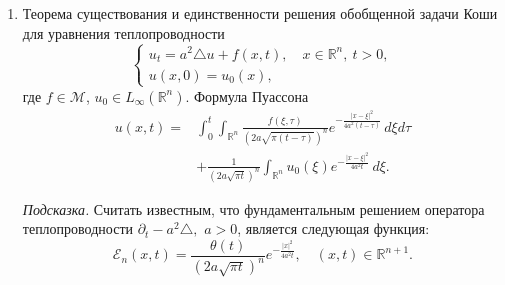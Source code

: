 \documentclass[12pt,a4paper,draft]{article}
\DeclareRobustCommand*{\т}{~--- }
\DeclareRobustCommand*{\ч}{~-- }
\begin{document}
\begin{enumerate}
\item
Теорема существования и единственности решения обобщенной задачи
Коши для уравнения теплопроводности
$$
    \left\{
        \begin{array}{l}
            u_t = a^2 \triangle u + f (x, t),
            \quad
            x \in {\mathbb R}^n,
            \:
            t > 0,
            \\
            u (x, 0) = u_0 (x),
        \end{array}
    \right.
$$
где $f \in {\mathcal M}$, $u_0 \in L_\infty ({\mathbb R}^n)$.
Формула Пуассона
\begin{align*}
    u (x, t)
    =
    {}
    &
    \int_0^t
    \int_{
        {\mathbb R}^n
    }
    \frac{
        f (\xi, \tau)
    }{
        (
            2
            a
            \sqrt {
                \pi
                (t - \tau)
            }
        )^n
    }
    e^{
        - \frac{
            |x - \xi|^2
        }{
            4
            a^2
            (t - \tau)
        }
    }
    \,
    d\xi
    d\tau
    \\
    &
    +
    \frac{
        1
    }{
        (
            2
            a
            \sqrt {
                \pi
                t
            }
        )^n
    }
    \int_{
        {\mathbb R}^n
    }
    u_0 (\xi)
    e^{
        - \frac{
            |x - \xi|^2
        }{
            4
            a^2
            t
        }
    }
    \,
    d\xi.
\end{align*}

{\it Подсказка.} Считать известным, что фундаментальным решением
оператора теплопроводности $
    \partial_t - a^2 \triangle,
$ $a > 0$, является следующая функция:
$$
    {\mathcal E}_n (x, t)
    =
    \frac{
        \theta (t)
    }{
        (
            2
            a
            \sqrt{
                \pi t
            }
        )^n
    }
    e^{
        - \frac{
            |x|^2
        }{
            4 a^2 t
        }
    },
    \quad
    (x, t) \in {\mathbb R}^{n+1}.
$$


\end{enumerate}
\end{document}
